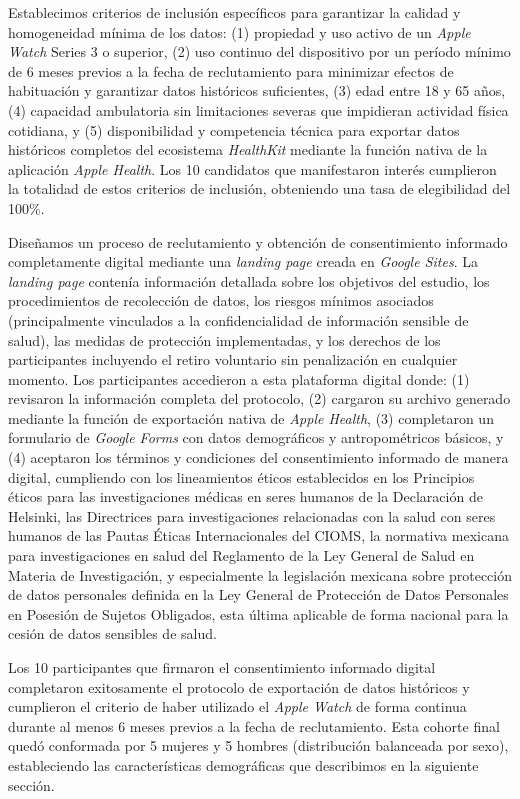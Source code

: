 Establecimos criterios de inclusión específicos para garantizar la calidad y homogeneidad mínima de los datos: (1) propiedad y uso activo de un \textit{Apple Watch} Series 3 o superior, (2) uso continuo del dispositivo por un período mínimo de 6 meses previos a la fecha de reclutamiento para minimizar efectos de habituación y garantizar datos históricos suficientes, (3) edad entre 18 y 65 años, (4) capacidad ambulatoria sin limitaciones severas que impidieran actividad física cotidiana, y (5) disponibilidad y competencia técnica para exportar datos históricos completos del ecosistema \textit{HealthKit} mediante la función nativa de la aplicación \textit{Apple Health}. Los 10 candidatos que manifestaron interés cumplieron la totalidad de estos criterios de inclusión, obteniendo una tasa de elegibilidad del 100\%.

Diseñamos un proceso de reclutamiento y obtención de consentimiento informado completamente digital mediante una \textit{landing page} creada en \textit{Google Sites}. La \textit{landing page} contenía información detallada sobre los objetivos del estudio, los procedimientos de recolección de datos, los riesgos mínimos asociados (principalmente vinculados a la confidencialidad de información sensible de salud), las medidas de protección implementadas, y los derechos de los participantes incluyendo el retiro voluntario sin penalización en cualquier momento. Los participantes accedieron a esta plataforma digital donde: (1) revisaron la información completa del protocolo, (2) cargaron su archivo  generado mediante la función de exportación nativa de \textit{Apple Health}, (3) completaron un formulario de \textit{Google Forms} con datos demográficos y antropométricos básicos, y (4) aceptaron los términos y condiciones del consentimiento informado de manera digital, cumpliendo con los lineamientos éticos establecidos en los Principios éticos para las investigaciones médicas en seres humanos de la Declaración de Helsinki, las Directrices para investigaciones relacionadas con la salud con seres humanos de las Pautas Éticas Internacionales del CIOMS, la normativa mexicana para investigaciones en salud del Reglamento de la Ley General de Salud en Materia de Investigación, y especialmente la legislación mexicana sobre protección de datos personales definida en la Ley General de Protección de Datos Personales en Posesión de Sujetos Obligados, esta última aplicable de forma nacional para la cesión de datos sensibles de salud.

Los 10 participantes que firmaron el consentimiento informado digital completaron exitosamente el protocolo de exportación de datos históricos y cumplieron el criterio de haber utilizado el \textit{Apple Watch} de forma continua durante al menos 6 meses previos a la fecha de reclutamiento. Esta cohorte final quedó conformada por 5 mujeres y 5 hombres (distribución balanceada por sexo), estableciendo las características demográficas que describimos en la siguiente sección.

